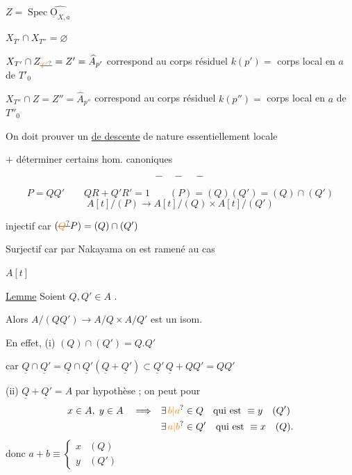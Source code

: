 $Z=\operatorname{Spec}\widehat{\underline{\mathrm O}_{X,a}}$

$X_{T'}\cap X_{T''}=\varnothing$

$X_{T'}\cap Z_{\deleted{\unsure{T'}}}=Z'=\widehat A_{p'}$ correspond au corps
résiduel $k(p')={}$ corps local en $a$ de $T'_0$

$X_{T''}\cap Z=Z''=\widehat A_{p''}$ correspond au corps
résiduel $k(p'')={}$ corps local en $a$ de $T''_0$

On doit prouver un \uline{ de descente}
de nature essentiellement locale

$+$ déterminer certains hom. canoniques

\[
-\quad-\quad-
\]

\[
P=QQ' \qquad QR+Q'R'=1 \qquad (P)=(Q)(Q')=(Q)\cap(Q')
\]
\[
 A[t]/(P)\longrightarrow A[t]/(Q)\times A[t]/(Q')
\]

injectif car $(\deleted{\unsure{Q}}P)=(Q)\cap(Q')$

Surjectif car par Nakayama on est ramené au cas

$A[t]$

\uline{Lemme} Soient $Q,Q'\in A$  \uline{}.

Alors $A/(QQ')\longrightarrow A/Q\times A/Q'$ est un isom.

En effet, (i) $(Q)\cap(Q')=Q.Q'$

car $\underline Q\cap\underline Q'=\underline Q\cap\underline Q'(\underline Q+\underline Q')\subset
\underline Q'\,\underline Q+QQ'=QQ'$

(ii) $\underline Q+\underline Q'=A$ par hypothèse ; on peut pour
\[
\begin{aligned}
 x\in A,\;y\in A\quad\Longrightarrow\quad&\exists\,\unsure{b|a}\in Q\quad\text{qui est }\equiv y\quad(Q')\\
 &\exists\,\unsure{a|b}\in Q'\quad\text{qui est }\equiv x\quad(Q).
\end{aligned}
\]
donc $a+b\equiv\begin{cases}x&(Q)\\ y&(Q')\end{cases}$

